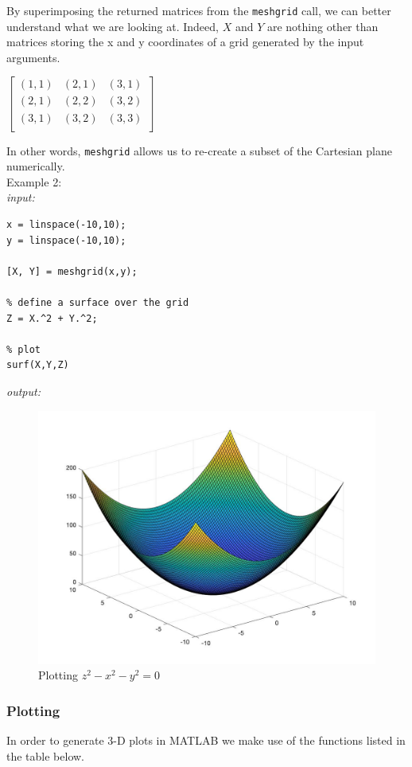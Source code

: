 \documentclass[../MATLAB_Primer.tex]{subfiles}
\begin{document}
By superimposing the returned matrices from the \texttt{meshgrid} call, we can better understand what we are looking at. Indeed, $X$ and $Y$ are nothing other than matrices storing the x and y coordinates of a grid generated by the input arguments.\\
\begin{center}
    $\begin{bmatrix}
    (1,1) & (2,1) & (3,1)\\
    (2,1) & (2,2) & (3,2)\\
    (3,1) & (3,2) & (3,3)\\
    \end{bmatrix}$
\end{center}
In other words, \texttt{meshgrid} allows us to re-create a subset of the Cartesian plane numerically.\\

Example 2:\\

\textit{input:}
\begin{lstlisting}
x = linspace(-10,10);
y = linspace(-10,10);

[X, Y] = meshgrid(x,y);

% define a surface over the grid 
Z = X.^2 + Y.^2;

% plot 
surf(X,Y,Z)
\end{lstlisting}
\textit{output:}
\begin{figure}[H]
    \centering
    \includegraphics[width=350pt]{images/plotting_example7.jpg}
    \caption{Plotting $z^{2} - x^{2} - y^{2} = 0$}
    \label{fig:plotting_example7}
\end{figure}

\subsubsection{Plotting}
In order to generate 3-D plots in MATLAB we make use of the functions listed in the table below. 
\end{document}
